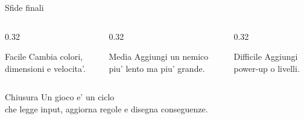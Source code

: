\documentclass[aspectratio=169]{beamer}
\newcommand{\player}[2]{
  \begin{scope}[shift={(#1,#2)}]
    \draw[fill=Green, draw=white, line width=1.2pt] (0,0) circle (0.32);
    \draw[white, line width=2.2pt, -{Latex[length=3mm]}] (0,0) -- (0.62,0);
    \fill[Ink!70] (0.12,0.1) circle (0.04);
  \end{scope}
}
\newcommand{\enemy}[2]{
  \begin{scope}[shift={(#1,#2)}]
    \draw[fill=Red, draw=white, line width=1pt] (0,0) circle (0.26);
    \fill[Ink!60] (0.08,0.08) circle (0.04);
  \end{scope}
}
\newcommand{\shot}[2]{
  \fill[Yellow] (#1,#2) circle (0.08);
}
\begin{document}
\begin{frame}{Sfide finali}
  \begin{columns}[T]
    \begin{column}{0.32\textwidth}
      \begin{block}{Facile}
        Cambia colori, dimensioni e velocita'.
      \end{block}
    \end{column}
    \begin{column}{0.32\textwidth}
      \begin{block}{Media}
        Aggiungi un nemico piu' lento ma piu' grande.
      \end{block}
    \end{column}
    \begin{column}{0.32\textwidth}
      \begin{block}{Difficile}
        Aggiungi power-up o livelli.
      \end{block}
    \end{column}
  \end{columns}
\end{frame}

\begin{frame}{Chiusura}
  \centering
  \Huge Un gioco e' un ciclo\\[0.25cm]
  \Large che legge input, aggiorna regole e disegna conseguenze.
  \vspace{0.5cm}

\end{frame}
\end{document}
